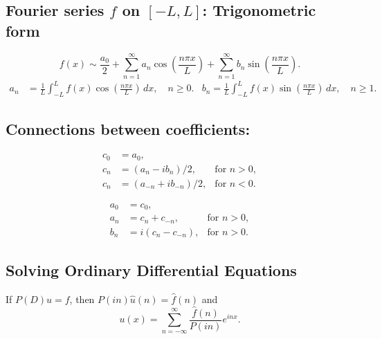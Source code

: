  \subsection*{Fourier series $f$ on $[-L,L]$: Trigonometric form}

   \[
  f(x) \sim \frac{a_0}2 + \sum_{n=1}^\infty a_n \cos\left(\frac {n\pi x}L \right) + 
  \sum_{n=1}^{\infty}b_n \sin\left(\frac{n\pi x}L \right).
 \]
  \begin{align*}
   a_n &= \frac 1L \int_{-L}^{L} f(x) \cos\left(\frac{n\pi x}L\right)\, dx, \quad n\geq 0.
  &b_n = \frac 1L \int_{-L}^L f(x) \sin\left(\frac{n\pi x}L \right)\, dx, \quad n\geq 1.
 \end{align*}

 \subsection*{Connections between coefficients:}
 \begin{minipage}{.45\linewidth}
    \begin{align*}
    c_0 &= a_0,\\
    c_n &= (a_n-ib_n)/2, &\text{for } n>0,\\
    c_n &= (a_{-n} + ib_{-n})/2, &\text{for } n<0.
    \end{align*}
  \end{minipage}%
  \begin{minipage}{.45\linewidth}
    \begin{align*}
    a_0 &= c_0,\\
    a_n &= c_n + c_{-n}, &\text{for } n>0,\\
    b_n &= i(c_n - c_{-n}), &\text{for } n>0.
    \end{align*}
  \end{minipage}%

 \subsection*{Solving Ordinary Differential Equations}
  If $P(D)u=f$, then $P(in)\hat u(n) = \hat f(n)$ and
\[ u(x) = \sum_{n=-\infty}^{\infty} \frac{\hat f(n)}{P(in)}e^{inx}.\]
 
